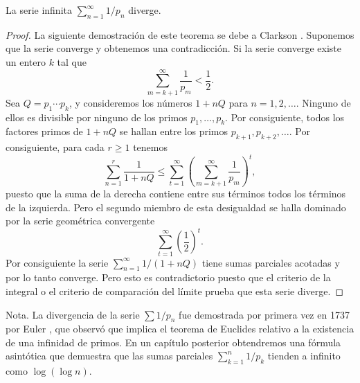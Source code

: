 \documentclass[12pt,a4paper]{book}
\begin{document}
    \begin{teorema}
        La serie infinita $\sum_{n=1}^{\infty}1/p_{n}$ diverge.
    \end{teorema}

    \begin{proof}
        La siguiente demostración de este teorema se debe a Clarkson \cite{clarkson1966}. Suponemos que la serie
        converge y obtenemos una contradicción. Si la serie converge existe un entero $k$
        tal que
        \begin{equation*}
            \sum_{m=k+1}^{\infty}\frac{1}{p_{m}}<\frac{1}{2}.
        \end{equation*}
        Sea $Q=p_{1}\cdots p_{k}$, y consideremos los números $1+nQ$ para $n=1,2,\dots$. Ninguno
        de ellos es divisible por ninguno de los primos $p_{1},\dots,p_{k}$. Por consiguiente,
        todos los factores primos de $1+nQ$ se hallan entre los primos $p_{k+1},p_{k+2},\dots$.
        Por consiguiente, para cada $r\geq1$ tenemos
        \begin{equation*}
            \sum_{n=1}^{r}\frac{1}{1+nQ}\leq\sum_{t=1}^{\infty}
            \left(\sum_{m=k+1}^{\infty}\frac{1}{p_{m}}\right)^{t},
        \end{equation*}
        puesto que la suma de la derecha contiene entre sus términos todos los términos de
        la izquierda. Pero el segundo miembro de esta desigualdad se halla dominado por la
        serie geométrica convergente
        \begin{equation*}
            \sum_{t=1}^{\infty}\left(\frac{1}{2}\right)^{t}.
        \end{equation*}
        Por consiguiente la serie $\sum_{n=1}^{\infty}1/(1+nQ)$ tiene sumas parciales
        acotadas y por lo tanto converge. Pero esto es contradictorio puesto que el criterio
        de la integral o el criterio de comparación del límite prueba que esta serie diverge.
    \end{proof}

    Nota. La divergencia de la serie $\sum1/p_{n}$ fue demostrada por primera vez en 1737 por
    Euler \cite{euler1737}, que observó que implica el teorema de Euclides relativo a la existencia de una
    infinidad de primos. En un capítulo posterior obtendremos una fórmula asintótica que
    demuestra que las sumas parciales $\sum_{k=1}^{n}1/p_{k}$ tienden a infinito como
    $\log(\log n)$.
\end{document}
